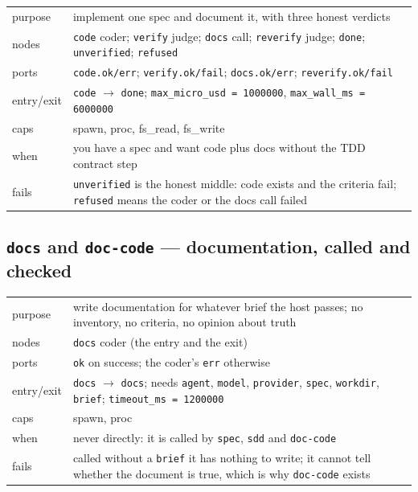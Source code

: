 \begin{center}\footnotesize
\begin{tabular}{@{}>{\raggedright\arraybackslash}p{}>{\raggedright\arraybackslash}p{}@{}}
  purpose & implement one spec and document it, with three honest verdicts \\
  nodes & \texttt{code} coder; \texttt{verify} judge; \texttt{docs} call; \texttt{reverify}
    judge; \texttt{done}; \texttt{unverified}; \texttt{refused} \\
  ports & \texttt{code.ok/err}; \texttt{verify.ok/fail}; \texttt{docs.ok/err};
    \texttt{reverify.ok/fail} \\
  entry/exit & \texttt{code} $\to$ \texttt{done}; \texttt{max\_micro\_usd = 1000000},
    \texttt{max\_wall\_ms = 6000000} \\
  caps & spawn, proc, fs\_read, fs\_write \\
  when & you have a spec and want code plus docs without the TDD contract step \\
  fails & \texttt{unverified} is the honest middle: code exists and the criteria fail;
    \texttt{refused} means the coder or the docs call failed \\
\end{tabular}
\end{center}

\subsection*{\texttt{docs} and \texttt{doc-code} --- documentation, called and checked}

\begin{center}\footnotesize
\begin{tabular}{@{}>{\raggedright\arraybackslash}p{}>{\raggedright\arraybackslash}p{}@{}}
  purpose & write documentation for whatever brief the host passes; no inventory, no criteria,
    no opinion about truth \\
  nodes & \texttt{docs} coder (the entry and the exit) \\
  ports & \texttt{ok} on success; the coder's \texttt{err} otherwise \\
  entry/exit & \texttt{docs} $\to$ \texttt{docs}; needs \texttt{agent}, \texttt{model},
    \texttt{provider}, \texttt{spec}, \texttt{workdir}, \texttt{brief};
    \texttt{timeout\_ms = 1200000} \\
  caps & spawn, proc \\
  when & never directly: it is called by \texttt{spec}, \texttt{sdd} and \texttt{doc-code} \\
  fails & called without a \texttt{brief} it has nothing to write; it cannot tell whether the
    document is true, which is why \texttt{doc-code} exists \\
\end{tabular}
\end{center}

